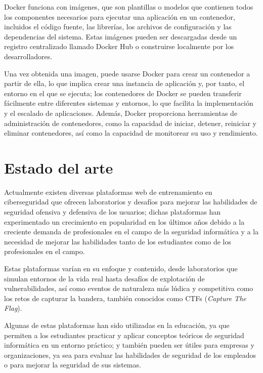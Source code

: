             Docker funciona con imágenes, que son plantillas o modelos que contienen todos los componentes necesarios para ejecutar una aplicación en un contenedor, incluidos el código fuente, las librerías, los archivos de configuración y las dependencias del sistema. Estas imágenes pueden ser descargadas desde un registro centralizado llamado Docker Hub o construirse localmente por los desarrolladores.
            
            Una vez obtenida una imagen, puede usarse Docker para crear un contenedor a partir de ella, lo que implica crear una instancia de aplicación y, por tanto, el entorno en el que se ejecuta; los contenedores de Docker se pueden transferir fácilmente entre diferentes sistemas y entornos, lo que facilita la implementación y el escalado de aplicaciones. Además, Docker proporciona herramientas de administración de contenedores, como la capacidad de iniciar, detener, reiniciar y eliminar contenedores, así como la capacidad de monitorear su uso y rendimiento.
            
            \newpage
    
     
\chapter{Estado del arte}

    Actualmente existen diversas plataformas web de entrenamiento en ciberseguridad que ofrecen laboratorios y desafíos para mejorar las habilidades de seguridad ofensiva y defensiva de los usuarios; dichas plataformas han experimentado un crecimiento en popularidad en los últimos años debido a la creciente demanda de profesionales en el campo de la seguridad informática y a la necesidad de mejorar las habilidades tanto de los estudiantes como de los profesionales en el campo.
    
    Estas plataformas varían en su enfoque y contenido, desde laboratorios que simulan entornos de la vida real hasta desafíos de explotación de vulnerabilidades, así como eventos de naturaleza más lúdica y competitiva como los retos de capturar la bandera, también conocidos como CTFs (\textit{Capture The Flag}).
    
    Algunas de estas plataformas han sido utilizadas en la educación, ya que permiten a los estudiantes practicar y aplicar conceptos teóricos de seguridad informática en un entorno práctico; y también pueden ser útiles para empresas y organizaciones, ya sea para evaluar las habilidades de seguridad de los empleados o para mejorar la seguridad de sus sistemas.
    
